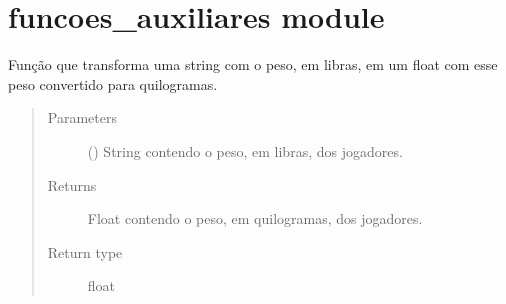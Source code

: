 \documentclass[letterpaper,10pt,brazil]{sphinxmanual}
\begin{document}
\begin{fulllineitems}
\begin{fulllineitems}
\begin{quote}
\begin{description}
\end{description}\end{quote}

\end{fulllineitems}


\end{fulllineitems}



\section{funcoes\_auxiliares module}
\label{\detokenize{funcoes_auxiliares:module-funcoes_auxiliares}}\label{\detokenize{funcoes_auxiliares:funcoes-auxiliares-module}}\label{\detokenize{funcoes_auxiliares::doc}}

\begin{fulllineitems}
\label{\detokenize{funcoes_auxiliares:funcoes_auxiliares.lbs_para_kg}}
Função que transforma uma string com o peso, em libras, em um float com esse peso convertido para quilogramas.
\begin{quote}\begin{description}
\item[{Parameters}] \leavevmode
{} () \textendash{} String contendo o peso, em libras, dos jogadores.

\item[{Returns}] \leavevmode
Float contendo o peso, em quilogramas, dos jogadores.

\item[{Return type}] \leavevmode
float

\end{description}\end{quote}

\end{fulllineitems}

\end{document}
